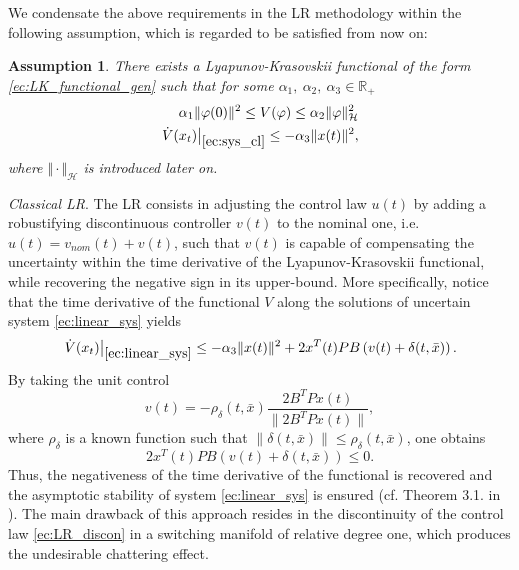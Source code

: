 \documentclass[onecolumn]{IEEEtran}
\newtheorem{assum}{Assumption}
\begin{document}
We condensate the above  requirements in the LR methodology within the following assumption, which is regarded to be satisfied from now on:
\begin{assum}
	\label{ass:func}
There exists a Lyapunov-Krasovskii functional of the form \eqref{ec:LK_functional_gen} such that for some  $\alpha_1,\:\alpha_2, \:\alpha_3\in \mathbb{R}_+$
\begin{eqnarray}
\label{ec:bound_cond}
\alpha_1 \|\varphi(0)\|^2 \leq V(\varphi)\leq \alpha_2 \|\varphi\|_{\mathcal{H}}^2\\
\label{ec:derivative_cond}
\left. \dot V(x_t)\right \rvert_{\eqref{ec:sys_cl}}\leq -\alpha_3 \|x(t)\|^2,
\end{eqnarray}
where $\Vert \cdot \Vert_{\mathcal{H}}$ is  introduced later on.
\end{assum}

\textit{Classical LR}. The LR  consists in adjusting  the control law $u(t)$ by adding a robustifying discontinuous controller $v(t)$ to the nominal one, i.e. $u(t)=v_{nom}(t)+v(t)$, such that $v(t)$ is capable of compensating the uncertainty within the time derivative of the Lyapunov-Krasovskii functional, while recovering the negative sign in its upper-bound. More specifically, notice that the time derivative of  the functional  $V$ along the solutions of uncertain system \eqref{ec:linear_sys} yields
	\begin{equation*}
	\begin{split}
	\left.\dot V(x_t)\right \rvert_{\eqref{ec:linear_sys}}\leq -\alpha_3\|x(t)\|^2  +2x^T(t)PB\left(v(t)+\delta(t,\bar x)\right).
	\end{split}
	\end{equation*} 
By taking the unit control
\begin{equation}
\label{ec:LR_discon}
v(t)=-\rho_{\delta}(t,\bar x)\frac{2B^TPx(t)}{\|2B^TPx(t)\|},
\end{equation} where $\rho_{\delta}$ is a known function such that $\|\delta(t,\bar x)\|\leq \rho_{\delta}(t,\bar x)$, 
one obtains
\begin{equation}
\label{ec:ineq_LR}
2x^T(t)PB(v(t)+\delta(t,\bar x))\leq 0.
\end{equation}
Thus,  the negativeness of the time derivative of the functional is recovered and the asymptotic stability of  system \eqref{ec:linear_sys} is ensured ({cf.} Theorem 3.1. in \cite{fridman2014introduction}). The main drawback of this approach resides in the discontinuity of the control law \eqref{ec:LR_discon} in a switching manifold  of relative degree one, which produces the undesirable chattering effect. 
\end{document}
